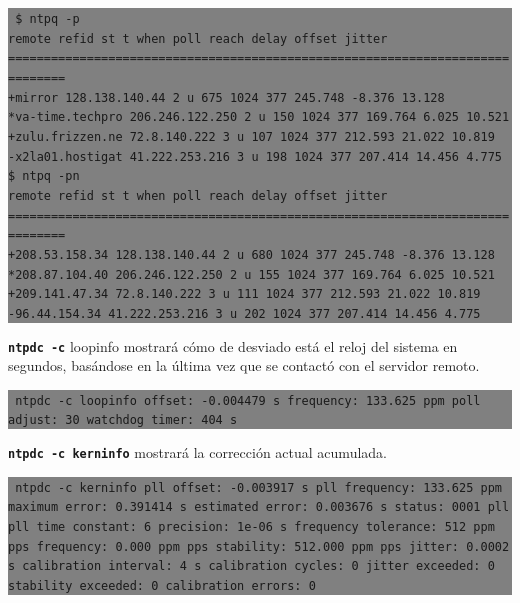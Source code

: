 \documentclass[12pt]{article}
\begin{document}
\colorbox{grey}{\parbox[t]{0.95\linewidth}{ \vspace*{0.5cm} {\tt      
\$ ntpq -p\\
     remote           refid      st t when poll reach   delay   offset  jitter\\
==============================================================================\\
+mirror          128.138.140.44   2 u  675 1024  377  245.748   -8.376  13.128\\
*va-time.techpro 206.246.122.250  2 u  150 1024  377  169.764    6.025  10.521\\
+zulu.frizzen.ne 72.8.140.222     3 u  107 1024  377  212.593   21.022  10.819\\
-x2la01.hostigat 41.222.253.216   3 u  198 1024  377  207.414   14.456   4.775\\
\$ ntpq -pn\\
     remote           refid      st t when poll reach   delay   offset  jitter\\
==============================================================================\\
+208.53.158.34   128.138.140.44   2 u  680 1024  377  245.748   -8.376  13.128\\
*208.87.104.40   206.246.122.250  2 u  155 1024  377  169.764    6.025  10.521\\
+209.141.47.34   72.8.140.222     3 u  111 1024  377  212.593   21.022  10.819\\
-96.44.154.34    41.222.253.216   3 u  202 1024  377  207.414   14.456   4.775\\

 } \vspace*{0.5cm} } } 

	
\texttt{\textbf{ntpdc -c}} loopinfo mostrará cómo de desviado está el reloj del sistema
en segundos, basándose en la última vez que se contactó con el servidor 
remoto.



\colorbox{grey}{\parbox[t]{0.95\linewidth}{ \vspace*{0.5cm} {\tt 
ntpdc -c loopinfo
offset:               -0.004479 s
frequency:            133.625 ppm
poll adjust:          30
watchdog timer:       404 s
 } \vspace*{0.5cm} } } 

	
\texttt{\textbf{ntpdc -c kerninfo}}  mostrará la corrección actual acumulada.


\colorbox{grey}{\parbox[t]{0.95\linewidth}{ \vspace*{0.5cm} {\tt 
ntpdc -c kerninfo
pll offset:           -0.003917 s
pll frequency:        133.625 ppm
maximum error:        0.391414 s
estimated error:      0.003676 s
status:               0001  pll
pll time constant:    6
precision:            1e-06 s
frequency tolerance:  512 ppm
pps frequency:        0.000 ppm
pps stability:        512.000 ppm
pps jitter:           0.0002 s
calibration interval: 4 s
calibration cycles:   0
jitter exceeded:      0
stability exceeded:   0
calibration errors:   0
 } \vspace*{0.5cm} } } 
\end{document}
